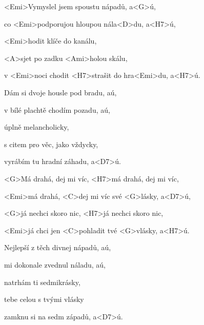 

\zs
<Emi>Vymyslel jsem spoustu nápadů, a<G>ú,

co <Emi>podporujou hloupou nála<D>du, a<H7>ú,

<Emi>hodit klíče do kanálu,

<A>sjet po zadku <Ami>holou skálu,

v <Emi>noci chodit <H7>strašit do hra<Emi>du, a<H7>ú.
\ks

\zs
Dám si dvoje housle pod bradu, aú,

v bílé plachtě chodím pozadu, aú,

úplně melancholicky,

s citem pro věc, jako vždycky,

vyrábím tu hradní záhadu, a<D7>ú.
\ks

\zr
<G>Má drahá, dej mi víc, <H7>má drahá, dej mi víc,

<Emi>má drahá, <C>dej mi víc své <G>lásky, a<D7>ú,

<G>já nechci skoro nic, <H7>já nechci skoro nic,

<Emi>já chci jen <C>pohladit tvé <G>vlásky, a<H7>ú.
\kr

\zs
Nejlepší z těch divnej nápadů, aú,

mi dokonale zvednul náladu, aú,

natrhám ti sedmikrásky,

tebe celou s tvými vlásky

zamknu si na sedm západů, a<D7>ú.
\ks

\zr \kr

\kp





